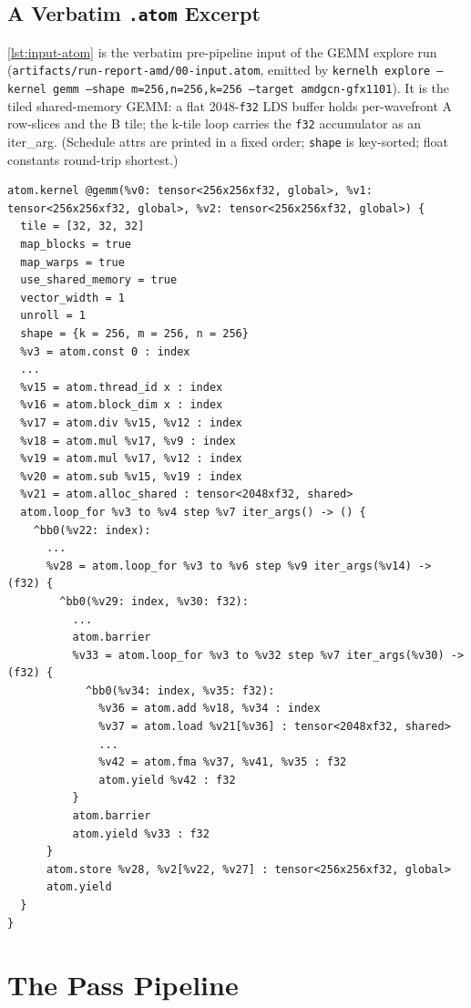 \documentclass[10pt,twoside]{article}
\begin{document}
\subsection{A Verbatim \texttt{.atom} Excerpt}
\label{sec:atom-syntax}

\cref{lst:input-atom} is the verbatim pre-pipeline input of the GEMM explore run
(\texttt{artifacts/run-report-amd/00-input.atom}, emitted by
\texttt{kernelh explore --kernel gemm --shape m=256,n=256,k=256 --target amdgcn-gfx1101}).
It is the tiled shared-memory GEMM: a flat 2048-\texttt{f32} LDS buffer holds per-wavefront
A row-slices and the B tile; the k-tile loop carries the \texttt{f32} accumulator as an
iter\_arg. (Schedule attrs are printed in a fixed order; \texttt{shape} is key-sorted; float
constants round-trip shortest.)

\begin{lstlisting}[caption={Pre-pipeline GEMM input (\texttt{00-input.atom}).},
                   label={lst:input-atom},basicstyle=\ttfamily\scriptsize,
                   breaklines=true,breakatwhitespace=false]
atom.kernel @gemm(%v0: tensor<256x256xf32, global>, %v1: tensor<256x256xf32, global>, %v2: tensor<256x256xf32, global>) {
  tile = [32, 32, 32]
  map_blocks = true
  map_warps = true
  use_shared_memory = true
  vector_width = 1
  unroll = 1
  shape = {k = 256, m = 256, n = 256}
  %v3 = atom.const 0 : index
  ...
  %v15 = atom.thread_id x : index
  %v16 = atom.block_dim x : index
  %v17 = atom.div %v15, %v12 : index
  %v18 = atom.mul %v17, %v9 : index
  %v19 = atom.mul %v17, %v12 : index
  %v20 = atom.sub %v15, %v19 : index
  %v21 = atom.alloc_shared : tensor<2048xf32, shared>
  atom.loop_for %v3 to %v4 step %v7 iter_args() -> () {
    ^bb0(%v22: index):
      ...
      %v28 = atom.loop_for %v3 to %v6 step %v9 iter_args(%v14) -> (f32) {
        ^bb0(%v29: index, %v30: f32):
          ...
          atom.barrier
          %v33 = atom.loop_for %v3 to %v32 step %v7 iter_args(%v30) -> (f32) {
            ^bb0(%v34: index, %v35: f32):
              %v36 = atom.add %v18, %v34 : index
              %v37 = atom.load %v21[%v36] : tensor<2048xf32, shared>
              ...
              %v42 = atom.fma %v37, %v41, %v35 : f32
              atom.yield %v42 : f32
          }
          atom.barrier
          atom.yield %v33 : f32
      }
      atom.store %v28, %v2[%v22, %v27] : tensor<256x256xf32, global>
      atom.yield
  }
}
\end{lstlisting}

\section{The Pass Pipeline}
\label{sec:pipeline}
\end{document}
